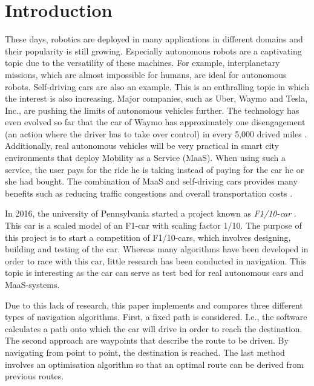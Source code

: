 \documentclass[conference,a4paper]{IEEEtran}
\begin{document}
\section{Introduction}
These days, robotics are deployed in many applications in different domains and their popularity is still growing. Especially autonomous robots are a captivating topic due to the versatility of these machines. For example, interplanetary missions, which are almost impossible for humans, are ideal for autonomous robots. 
Self-driving cars are also an example. This is an enthralling topic in which the interest is also increasing. Major companies, such as Uber, Waymo and Tesla, Inc., are pushing the limits of autonomous vehicles further. The technology has even evolved so far that the car of Waymo has approximately one disengagement (an action where the driver has to take over control) in every 5,000 drived miles \cite{Mui2017}. 
Additionally, real autonomous vehicles will be very practical in smart city environments that deploy Mobility as a Service (MaaS). When using such a service, the user pays for the ride he is taking instead of paying for the car he or she had bought. The combination of MaaS and self-driving cars provides many benefits such as reducing traffic congestions and overall transportation costs \cite{Speculations}.

In 2016, the university of Pennsylvania started a project known as \emph{F1/10-car} \cite{f1tenth}. This car is a scaled model of an F1-car with scaling factor 1/10. The purpose of this project is to start a competition of F1/10-cars, which involves designing, building and testing of the car. Whereas many algorithms have been developed in order to race with this car, little research has been conducted in navigation. This topic is interesting as the car can serve as test bed for real autonomous cars and MaaS-systems.

Due to this lack of research, this paper implements and compares three different types of navigation algorithms. First, a fixed path is considered. I.e., the software calculates a path onto which the car will drive in order to reach the destination. The second approach are waypoints that describe the route to be driven. By navigating from point to point, the destination is reached. The last method involves an optimisation algorithm so that an optimal route can be derived from previous routes.
\end{document}
